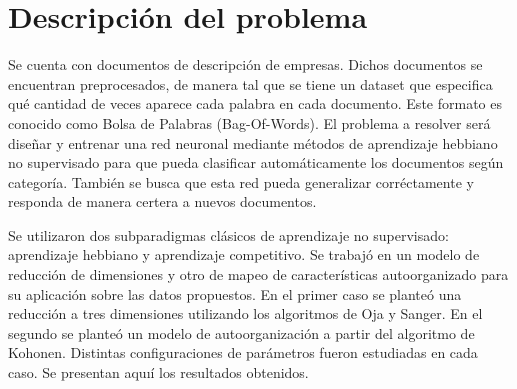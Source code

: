 \section{Descripción del problema}

\par Se cuenta con documentos de descripción de empresas. Dichos documentos se encuentran preprocesados, de manera tal que se tiene un dataset que especifica qué cantidad de veces aparece cada palabra en cada documento. Este formato es conocido como Bolsa de Palabras (Bag-Of-Words). El problema a resolver será diseñar y entrenar una red neuronal mediante métodos de aprendizaje hebbiano no supervisado para que pueda clasificar automáticamente los documentos según categoría. También se busca que esta red pueda generalizar corréctamente y responda de manera certera a nuevos documentos.


\par Se utilizaron dos subparadigmas clásicos de aprendizaje no supervisado: aprendizaje hebbiano y aprendizaje competitivo. Se trabajó en un modelo de reducción de dimensiones y otro de mapeo de características auto\-organizado para su aplicación sobre las datos propuestos. En el primer caso se planteó una reducción a tres dimensiones utilizando los algoritmos de Oja y Sanger. En el segundo se planteó un modelo de auto\-organización a partir del algoritmo de Kohonen. Distintas configuraciones de parámetros fueron estudiadas en cada caso. Se presentan aquıí los resultados obtenidos.